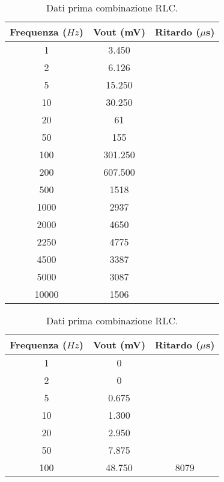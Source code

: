 \begin{table}[H]
    \centering
    \begin{minipage}[t]{0.45\textwidth}
        \begin{center}
            \begin{tabular}{|c|c|c|}
                \hline
                Frequenza ($Hz$) & Vout (mV) & Ritardo ($\mu$s)\\
                \hline
                1 & 3.450 & \\
                2 & 6.126 & \\
                5 & 15.250 & \\
                10 & 30.250&\\
                20 & 61 & \\
                50 & 155 & \\
                100 & 301.250 &  \\
                200 & 607.500 &  \\
                500 & 1518 &  \\
                1000 & 2937 & \\
                2000 & 4650 & \\
                2250 & 4775 & \\
                4500 & 3387 & \\
                5000 & 3087 & \\
                10000 & 1506 & \\
                \hline
            \end{tabular}
            \caption{Dati prima combinazione RLC.}
        \end{center}
    \end{minipage}
    \hfill
    \begin{minipage}[t]{0.45\textwidth}
        \begin{center}
           \begin{tabular}{|c|c|c|}
                \hline
                Frequenza ($Hz$) & Vout (mV) & Ritardo ($\mu$s)\\
                \hline
                1 & 0 &\\
                2 & 0 &\\
                5 & 0.675 & \\
                10 & 1.300 & \\
                20 & 2.950 & \\
                50 & 7.875  & \\
                100 & 48.750 & 8079\\

\end{tabular}
\end{center}
\end{minipage}
\end{table}
